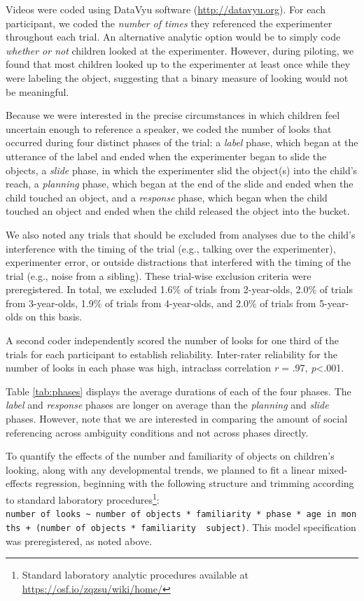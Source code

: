 \documentclass[english,man]{apa6}
\theoremstyle{definition}
\theoremstyle{definition}
\theoremstyle{definition}
\theoremstyle{remark}
\begin{document}
Videos were coded using DataVyu software (\url{http://datavyu.org}). For
each participant, we coded the \emph{number of times} they referenced
the experimenter throughout each trial. An alternative analytic option
would be to simply code \emph{whether or not} children looked at the
experimenter. However, during piloting, we found that most children
looked up to the experimenter at least once while they were labeling the
object, suggesting that a binary measure of looking would not be
meaningful.

Because we were interested in the precise circumstances in which
children feel uncertain enough to reference a speaker, we coded the
number of looks that occurred during four distinct phases of the trial:
a \emph{label} phase, which began at the utterance of the label and
ended when the experimenter began to slide the objects, a \emph{slide}
phase, in which the experimenter slid the object(s) into the child's
reach, a \emph{planning} phase, which began at the end of the slide and
ended when the child touched an object, and a \emph{response} phase,
which began when the child touched an object and ended when the child
released the object into the bucket.

We also noted any trials that should be excluded from analyses due to
the child's interference with the timing of the trial (e.g., talking
over the experimenter), experimenter error, or outside distractions that
interfered with the timing of the trial (e.g., noise from a sibling).
These trial-wise exclusion criteria were preregistered. In total, we
excluded 1.6\% of trials from 2-year-olds, 2.0\% of trials from
3-year-olds, 1.9\% of trials from 4-year-olds, and 2.0\% of trials from
5-year-olds on this basis.

A second coder independently scored the number of looks for one third of
the trials for each participant to establish reliability. Inter-rater
reliability for the number of looks in each phase was high, intraclass
correlation \emph{r} = .97, \emph{p}\textless{}.001.

Table \ref{tab:phases} displays the average durations of each of the
four phases. The \emph{label} and \emph{response} phases are longer on
average than the \emph{planning} and \emph{slide} phases. However, note
that we are interested in comparing the amount of social referencing
across ambiguity conditions and not across phases directly.

To quantify the effects of the number and familiarity of objects on
children's looking, along with any developmental trends, we planned to
fit a linear mixed-effects regression, beginning with the following
structure and trimming according to standard laboratory
procedures\footnote{Standard laboratory analytic procedures available at
  \url{https://osf.io/zqzsu/wiki/home/}}:
\texttt{number\ of\ looks\ \textasciitilde{}\ number\ of\ objects\ *\ familiarity\ *\ phase\ *\ age\ in\ months\ +\ (number\ of\ objects\ *\ familiarity\ \textbar{}\ subject)}.
This model specification was preregistered, as noted above.
\end{document}
